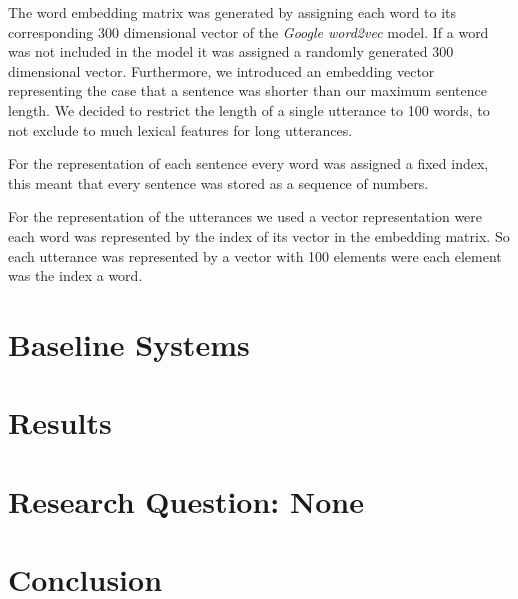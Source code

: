 \documentclass[11pt,a4paper]{article}
\begin{document}
	The word embedding matrix was generated by assigning each word to its corresponding 300 dimensional vector of the \textit{Google word2vec} model. If a word was not included in the model it was assigned a randomly generated 300 dimensional vector.	Furthermore, we introduced an embedding vector representing the case that a sentence was shorter than our maximum sentence length. We decided to restrict the length of a single utterance to 100 words, to not exclude to much lexical features for long utterances.
	
	For the representation of each sentence every word was assigned a fixed index, this meant that every sentence was stored as a sequence of numbers.
	
	For the representation of the utterances we used a vector representation were each word was represented by the index of its vector in the embedding matrix. So each utterance was represented by a vector with 100 elements were each element was the index a word.
	

\section{Baseline Systems}

\section{Results}

\section{Research Question: None}

\section{Conclusion}



\nocite{*}
\end{document}
